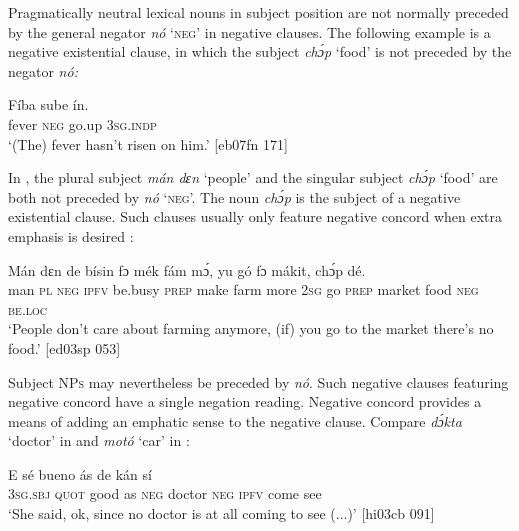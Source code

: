 Pragmatically neutral lexical nouns in subject position are not normally preceded by the general negator \textit{nó} ‘\textsc{neg}’ in negative clauses. The following example is a negative existential clause, in which the subject \textit{chɔ́p} ‘food’ is not preceded by the negator \textit{nó:}



\ea%
    \label{ex:key:548}
    \gll Fíba      sube    ín.\\
fever  \textsc{neg}  go.up  \textsc{3sg.indp}\\

\glt ‘(The) fever hasn’t risen on him.’ [eb07fn 171]
\z

In , the plural subject \textit{mán dɛn} ‘people’ and the singular subject \textit{chɔ́p} ‘food’ are both not preceded by \textit{nó} ‘\textsc{neg}’. The noun \textit{chɔ́p} is the subject of a negative existential clause. Such clauses usually only feature negative concord when extra emphasis is desired : 


\ea%
    \label{ex:key:549}
    \gll Mán    dɛn    de  bísin  fɔ  mék    fám    mɔ́,
yu  gó  fɔ  mákit,  chɔ́p    dé.\\
man    \textsc{pl}  \textsc{neg}  \textsc{ipfv}  be.busy  \textsc{prep}  make  farm  more
\textsc{2sg}  go  \textsc{prep}  market  food    \textsc{neg}  \textsc{be.loc}\\

\glt 
‘People don’t care about farming anymore, (if) you go to the market 
there’s no food.’ [ed03sp 053]
\z

Subject \textsc{NPs} may nevertheless be preceded by \textit{nó}. Such negative clauses featuring negative concord have a single negation reading. Negative concord provides a means of adding an emphatic sense to the negative clause. Compare \textit{dɔ́kta} ‘doctor’ in  and \textit{motó} ‘car’ in :


\ea%
    \label{ex:key:550}
    \gll E    sé    bueno  ás        de  kán    sí  \\
\textsc{3sg.sbj}  \textsc{quot}    good  as  \textsc{neg}  doctor  \textsc{neg}  \textsc{ipfv}  come  see\\

\glt ‘She said, ok, since no doctor is at all coming to see (...)’ [hi03cb 091]
\z


